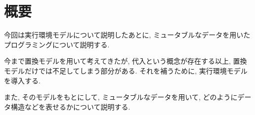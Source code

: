 
%
\author{Daniel Perez}
%

\maketitle
%
\section*{概要}
%
今回は実行環境モデルについて説明したあとに, ミュータブルなデータを用いた
プログラミングについて説明する.

今まで置換モデルを用いて考えてきたが, 代入という概念が存在する以上,
置換モデルだけでは不足してしまう部分がある. それを補うために,
実行環境モデルを導入する.

また, そのモデルをもとにして, ミュータブルなデータを用いて,
どのようにデータ構造などを表せるかについて説明する.
%

%

%

